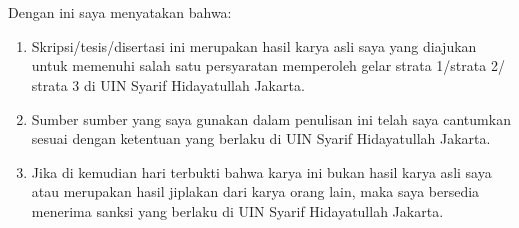 \chapter*{}
\noindent
Dengan ini saya menyatakan bahwa:

\begin{enumerate}[leftmargin=*]

    \item Skripsi/tesis/disertasi ini merupakan hasil karya asli saya yang diajukan untuk memenuhi salah satu persyaratan memperoleh gelar strata 1/strata 2/ strata 3 di UIN Syarif Hidayatullah Jakarta.

    \item Sumber sumber yang saya gunakan dalam penulisan ini telah saya cantumkan sesuai dengan ketentuan yang berlaku di UIN Syarif Hidayatullah Jakarta.
    
    \item Jika di kemudian hari terbukti bahwa karya ini bukan hasil karya asli saya atau merupakan hasil jiplakan dari karya orang lain, maka saya bersedia menerima sanksi yang berlaku di UIN Syarif Hidayatullah Jakarta.
\end{enumerate}

\vspace{2cm}

